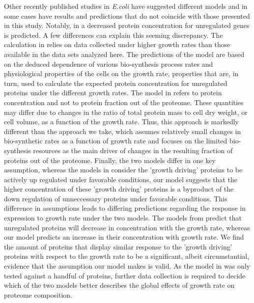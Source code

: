 \documentclass[10pt,letterpaper]{article}
\begin{document}
Other recently published studies in \emph{E.coli} have suggested different models and in some cases have results  and predictions that do not coincide with those presented in this study.
Notably, in \cite{Klumpp2009,Klumpp2014} a decreased protein concentration for unregulated genes is predicted.
A few differences can explain this seeming discrepancy.
The calculation in \cite{Klumpp2009} relies on data collected under higher growth rates than those available in the data sets analyzed here.
The predictions of the model are based on the deduced dependence of various bio-synthesis process rates and physiological properties of the cells on the growth rate, properties that are, in turn, used to calculate the expected protein concentration for unregulated proteins under the different growth rates.
The model in \cite{Klumpp2009} refers to protein concentration and not to protein fraction out of the proteome. These quantities may differ due to changes in the ratio of total protein mass to cell dry weight, or cell volume, as a function of the growth rate.
Thus, this approach is markedly different than the approach we take, which assumes relatively small changes in bio-synthetic rates as a function of growth rate and focuses on the limited bio-synthesis resources as the main driver of changes in the resulting fraction of proteins out of the proteome.
Finally, the two models differ in one key assumption, whereas the models in \cite{Klumpp2009,Scott2010,Scott2011,Klumpp2014} consider the 'growth driving' proteins to be actively up regulated under favorable conditions, our model suggests that the higher concentration of these 'growth driving' proteins is a byproduct of the down regulation of unneccessary proteins under favorable conditions.
This difference in assumptions leads to differing predictions regarding the response in expression to growth rate under the two models.
The models from \cite{Klumpp2009,Scott2010,Scott2011,Klumpp2014} predict that unregulated proteins will decrease in concentration with the growth rate, whereas our model predicts an increase in their concentration with growth rate.
We find the amount of proteins that display similar response to the 'growth driving' proteins with respect to the growth rate to be a significant, albeit circumstantial, evidence that the assumption our model makes is valid.
As the model in \cite{Klumpp2009} was only tested against a handful of proteins, further data collection is required to decide which of the two models better describes the global effects of growth rate on proteome composition.
\end{document}
